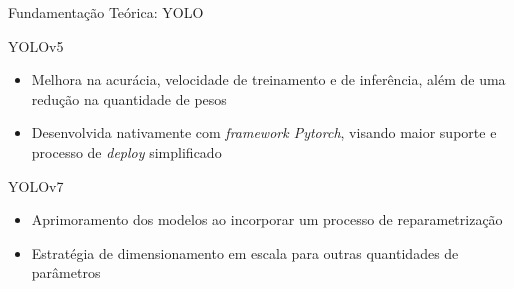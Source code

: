 \begin{frame}{Fundamentação Teórica: YOLO}

\begin{block}{YOLOv5 \cite{Yolov5}}
\begin{itemize}
    \item Melhora na acurácia, velocidade de treinamento e de inferência, além de uma redução na quantidade de pesos
    \item Desenvolvida nativamente com \emph{framework Pytorch}, visando maior suporte e processo de \emph{deploy} simplificado 
\end{itemize}

\end{block}
\begin{block}{YOLOv7 \cite{yolov7}}
\begin{itemize}
    \item Aprimoramento dos modelos ao incorporar um processo de reparametrização
    \item Estratégia de dimensionamento em escala para outras quantidades de parâmetros
\end{itemize}
\end{block}

\end{frame}
